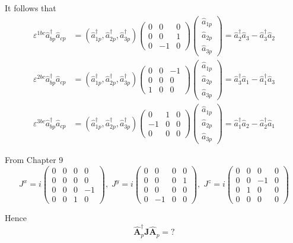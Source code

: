 \documentclass[12pt]{article}
\begin{document}
It follows that
\begin{align*}
\varepsilon^{1bc}\hat a_{bp}^\dag\hat a_{cp}
&=(\hat a_{1p}^\dag,\hat a_{2p}^\dag,\hat a_{3p}^\dag)
\begin{pmatrix}
0&0&0
\\
0&0&1
\\
0&-1&0
\end{pmatrix}
\begin{pmatrix}\hat a_{1p}\\\hat a_{2p}\\\hat a_{3p}\end{pmatrix}
=\hat a_2^\dag\hat a_3-\hat a_3^\dag\hat a_2
\\
\varepsilon^{2bc}\hat a_{bp}^\dag\hat a_{cp}
&=(\hat a_{1p}^\dag,\hat a_{2p}^\dag,\hat a_{3p}^\dag)
\begin{pmatrix}
0&0&-1
\\
0&0&0
\\
1&0&0
\end{pmatrix}
\begin{pmatrix}\hat a_{1p}\\\hat a_{2p}\\\hat a_{3p}\end{pmatrix}
=\hat a_3^\dag\hat a_1-\hat a_1^\dag\hat a_3
\\
\varepsilon^{3bc}\hat a_{bp}^\dag\hat a_{cp}
&=(\hat a_{1p}^\dag,\hat a_{2p}^\dag,\hat a_{3p}^\dag)
\begin{pmatrix}
0&1&0
\\
-1&0&0
\\
0&0&0
\end{pmatrix}
\begin{pmatrix}\hat a_{1p}\\\hat a_{2p}\\\hat a_{3p}\end{pmatrix}
=\hat a_1^\dag\hat a_2-\hat a_2^\dag\hat a_1
\end{align*}

From Chapter 9
\begin{equation*}
J^x=i\begin{pmatrix}
0&0&0&0
\\
0&0&0&0
\\
0&0&0&-1
\\
0&0&1&0
\end{pmatrix},
\;
J^y=i\begin{pmatrix}
0&0&0&0
\\
0&0&0&1
\\
0&0&0&0
\\
0&-1&0&0
\end{pmatrix},
\;
J^z=i\begin{pmatrix}
0&0&0&0
\\
0&0&-1&0
\\
0&1&0&0
\\
0&0&0&0
\end{pmatrix}
\end{equation*}

Hence
\begin{equation*}
\hat{\mathbf A}_p^\dag\mathbf J\hat{\mathbf A}_p={}?
\end{equation*}

\end{document}
